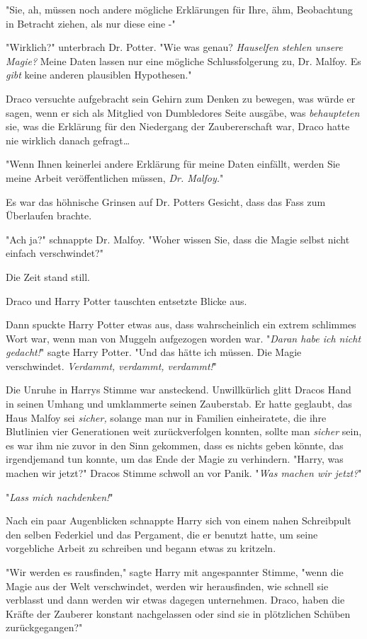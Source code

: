 {"Sie, ah, müssen noch andere mögliche Erklärungen für Ihre, ähm, Beobachtung in Betracht ziehen, als nur diese eine -"

"Wirklich?" unterbrach Dr. Potter. "Wie was genau? \emph{Hauselfen} \emph{stehlen unsere Magie?} Meine Daten lassen nur eine mögliche Schlussfolgerung zu, Dr. Malfoy. Es \emph{gibt} keine anderen plausiblen Hypothesen."

Draco versuchte aufgebracht sein Gehirn zum Denken zu bewegen, was würde er sagen, wenn er sich als Mitglied von Dumbledores Seite ausgäbe, was \emph{behaupteten} sie, was die Erklärung für den Niedergang der Zaubererschaft war, Draco hatte nie wirklich danach gefragt…

"Wenn Ihnen keinerlei andere Erklärung für meine Daten einfällt, werden Sie meine Arbeit veröffentlichen müssen, \emph{Dr. Malfoy.}"

Es war das höhnische Grinsen auf Dr. Potters Gesicht, dass das Fass zum Überlaufen brachte.

"Ach ja?" schnappte Dr. Malfoy. "Woher wissen Sie, dass die Magie selbst nicht einfach verschwindet?"

Die Zeit stand still.

Draco und Harry Potter tauschten entsetzte Blicke aus.

Dann spuckte Harry Potter etwas aus, dass wahrscheinlich ein extrem schlimmes Wort war, wenn man von Muggeln aufgezogen worden war. "\emph{Daran habe ich nicht gedacht!}" sagte Harry Potter. "Und das hätte ich müssen. Die Magie verschwindet. \emph{Verdammt, verdammt, verdammt!}"

Die Unruhe in Harrys Stimme war ansteckend. Unwillkürlich glitt Dracos Hand in seinen Umhang und umklammerte seinen Zauberstab. Er hatte geglaubt, das Haus Malfoy sei \emph{sicher,} solange man nur in Familien einheiratete, die ihre Blutlinien vier Generationen weit zurückverfolgen konnten, sollte man \emph{sicher} sein, es war ihm nie zuvor in den Sinn gekommen, dass es nichts geben könnte, das irgendjemand tun konnte, um das Ende der Magie zu verhindern. "Harry, was machen wir jetzt?" Dracos Stimme schwoll an vor Panik. "\emph{Was machen wir jetzt?}"

"\emph{Lass mich nachdenken!}"

Nach ein paar Augenblicken schnappte Harry sich von einem nahen Schreibpult den selben Federkiel und das Pergament, die er benutzt hatte, um seine vorgebliche Arbeit zu schreiben und begann etwas zu kritzeln.

"Wir werden es rausfinden," sagte Harry mit angespannter Stimme, "wenn die Magie aus der Welt verschwindet, werden wir herausfinden, wie schnell sie verblasst und dann werden wir etwas dagegen unternehmen. Draco, haben die Kräfte der Zauberer konstant nachgelassen oder sind sie in plötzlichen Schüben zurückgegangen?"

}
